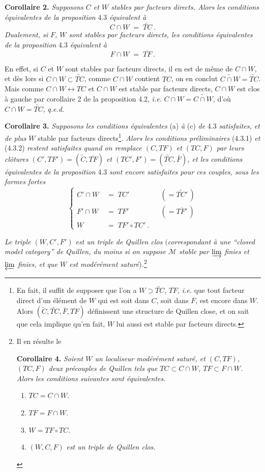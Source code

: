 \textbf{Corollaire 2.} \textit{Supposons $C$ et $W$ stables par facteurs directs. Alors les conditions équivalentes de la proposition} 4.3 \textit{équivalent à}
\[
C\cap W \;=\; \widetilde{TC}\ . \tag*{(4.3.5)}
\]
\textit{Dualement, si $F$, $W$ sont stables par facteurs directs, les conditions équivalentes de la proposition} 4.3 \textit{équivalent à}
\[
F\cap W \;=\; \overline{TF}\ . \tag*{(4.3.5$'$)}
\]

En effet, si $C$ et $W$ sont stables par facteurs directs, il en est de même de $C\cap W$, et dès lors si $C\cap W\subset\widetilde{TC}$, comme $C\cap W$ contient $TC$, on en conclut $\widetilde{C\cap W}=\widetilde{TC}$. Mais comme $C\cap W\longleftrightarrow TC$ et $C\cap W$ est stable par facteurs directs, $C\cap W$ est clos à gauche par corollaire 2 de la proposition 4.2, \textit{i.e.} $C\cap W=\widetilde{C\cap W}$, d'où $C\cap W=\widetilde{TC}$, \quad \textit{q.e.d.}

\textbf{Corollaire 3.} \textit{Supposons les conditions équivalentes} (a) \textit{à} (c) \textit{de} 4.3 \textit{satisfaites, et de plus} $W$ stable par facteurs directs\footnote[12]{En fait, il suffit de supposer que l'on a $W\supset\widetilde{TC}$, $\overline{TF}$, \textit{i.e.} que tout facteur direct d'un élément de $W$ qui est soit dans $C$, soit dans $F$, est encore dans $W$. Alors $(\widetilde{C},\widetilde{TC},\bar{F},\overline{TF})$ définissent une structure de Quillen close, et on sait que cela implique qu'en fait, $W$ lui aussi est stable par facteurs directs.}. \textit{Alors les conditions préliminaires} (4.3.1) \textit{et} (4.3.2) \textit{restent satisfaites quand on remplace $(C,TF)$ et $(TC,F)$ par leurs clôtures $(C',TF')=(\widetilde{C},\overline{TF})$ et $(TC',F')=(\widetilde{TC},\bar{F})$, et les conditions équivalentes de la proposition} 4.3 \textit{sont encore satisfaites pour ces couples, sous les formes fortes}
\[
\left\{
\begin{aligned}
C'\cap W &\;=\; TC' && (=\widetilde{TC'}\,)\\
F'\cap W &\;=\; TF' && (=\overline{TF'}\,)\\
W &\;=\; TF'\circ TC'\ .
\end{aligned}
\right.
\tag*{(4.3.6)}
\]

\textit{Le triple $(W,C',F')$ est un triple de Quillen clos $($correspondant à une “closed model category” de Quillen, du moins si on suppose $\mathcal{M}$ stable par $\varinjlim$ finies et $\varprojlim$ finies, et que $W$ est modérément saturé$)$.}\footnote[13]{Il en résulte le\par
\textbf{Corollaire 4.} \textit{Soient $W$ un localiseur modérément saturé, et $(C,TF)$, $(TC,F)$ deux précouples de Quillen tels que $TC\subset C\cap W$, $TF\subset F\cap W$. Alors les conditions suivantes sont équivalentes.}
\begin{enumerate}[leftmargin=*]
\item[a)] $TC=C\cap W$.
\item[b)] $TF=F\cap W$.
\item[c)] $W=TF\circ TC$.
\item[d)] $(W,C,F)$ \textit{est un triple de Quillen clos.}
\end{enumerate}}

